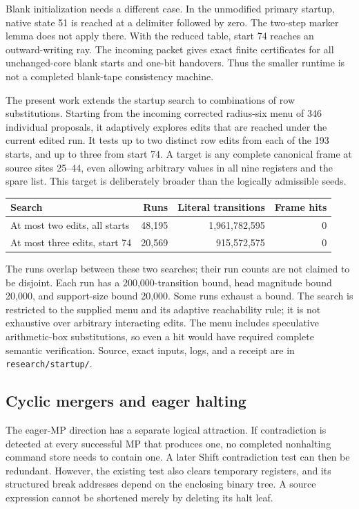 \documentclass[11pt,letterpaper]{article}
\newcommand{\file}[1]{\texttt{\nolinkurl{#1}}}
\begin{document}
Blank initialization needs a different case. In the unmodified primary
startup, native state 51 is reached at a delimiter followed by zero. The
two-step marker lemma does not apply there. With the reduced table, start
74 reaches an outward-writing ray. The incoming packet gives exact finite
certificates for all unchanged-core blank starts and one-bit handovers.
Thus the smaller runtime is not a completed blank-tape consistency machine.

The present work extends the startup search to combinations of row
substitutions. Starting from the incoming corrected radius-six menu of
346 individual proposals, it adaptively explores edits that are reached
under the current edited run. It tests up to two distinct row edits from
each of the 193 starts, and up to three from start 74. A target is any
complete canonical frame at source sites 25--44, even allowing arbitrary
values in all nine registers and the spare list. This target is deliberately
broader than the logically admissible seeds.

\begin{center}
\begin{tabular}{@{}lrrr@{}}\toprule
Search & Runs & Literal transitions & Frame hits\\\midrule
At most two edits, all starts & 48,195 & 1,961,782,595 & 0\\
At most three edits, start 74 & 20,569 & 915,572,575 & 0\\\bottomrule
\end{tabular}
\end{center}
The runs overlap between these two searches; their run counts are not
claimed to be disjoint. Each run has a 200,000-transition bound, head
magnitude bound 20,000, and support-size bound 20,000. Some runs exhaust a
bound. The search is restricted to the supplied menu and its adaptive
reachability rule; it is not exhaustive over arbitrary interacting edits.
The menu includes speculative arithmetic-box substitutions, so even a hit
would have required complete semantic verification. Source, exact inputs,
logs, and a receipt are in \file{research/startup/}.

\subsection{Cyclic mergers and eager halting}


The eager-MP direction has a separate logical attraction. If contradiction
is detected at every successful MP that produces one, no completed
nonhalting command store needs to contain one. A later Shift contradiction
test can then be redundant. However, the existing test also clears
temporary registers, and its structured break addresses depend on the
enclosing binary tree. A source expression cannot be shortened merely by
deleting its halt leaf.
\end{document}
